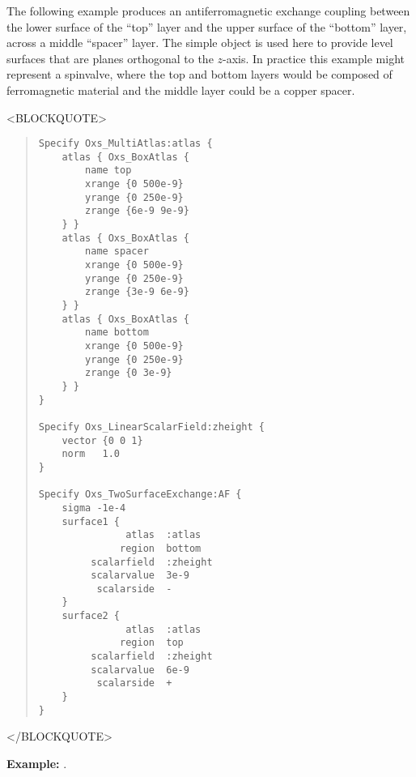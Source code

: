 \begin{itemize}
\begin{description}
   The following example produces an antiferromagnetic exchange coupling
   between the lower surface of the ``top'' layer and the upper surface
   of the ``bottom'' layer, across a middle ``spacer'' layer.  The
   simple  object is used here to provide
   level surfaces that are planes orthogonal to the $z$-axis.  In
   practice this example might represent a spinvalve, where the top and
   bottom layers would be composed of ferromagnetic material and the
   middle layer could be a copper spacer.
\begin{rawhtml}<BLOCKQUOTE>\end{rawhtml}
\begin{quote}
\begin{verbatim}
Specify Oxs_MultiAtlas:atlas {
    atlas { Oxs_BoxAtlas {
        name top
        xrange {0 500e-9}
        yrange {0 250e-9}
        zrange {6e-9 9e-9}
    } }
    atlas { Oxs_BoxAtlas {
        name spacer
        xrange {0 500e-9}
        yrange {0 250e-9}
        zrange {3e-9 6e-9}
    } }
    atlas { Oxs_BoxAtlas {
        name bottom
        xrange {0 500e-9}
        yrange {0 250e-9}
        zrange {0 3e-9}
    } }
}

Specify Oxs_LinearScalarField:zheight {
    vector {0 0 1}
    norm   1.0
}

Specify Oxs_TwoSurfaceExchange:AF {
    sigma -1e-4
    surface1 {
               atlas  :atlas
              region  bottom
         scalarfield  :zheight
         scalarvalue  3e-9
          scalarside  -
    }
    surface2 {
               atlas  :atlas
              region  top
         scalarfield  :zheight
         scalarvalue  6e-9
          scalarside  +
    }
}\end{verbatim}
\end{quote}
\begin{rawhtml}</BLOCKQUOTE>\end{rawhtml}

\textbf{Example:} .



\end{description}
\end{itemize}
